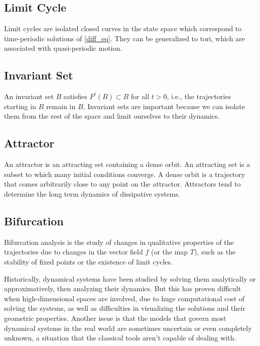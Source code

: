 \documentclass{article}
\begin{document}
\subsection{Limit Cycle}%
\label{sub:limit_cycle}

Limit cycles are isolated closed curves in the state space which correspond to
time-periodic solutions of \eqref{diff_eq}.
They can be generalized to tori, which are associated with quasi-periodic
motion.

\subsection{Invariant Set}%
\label{sub:invariant_set}

An invariant set $B$ satisfies $F^t(B) \subset B$ for all $t > 0$, i.e., the
trajectories starting in $B$ remain in $B$.
Invariant sets are important because we can isolate them from the rest of the
space and limit ourselves to their dynamics.

\subsection{Attractor}%
\label{sub:attractor}

An attractor is an attracting set containing a dense orbit.
An attracting set is a subset to which many initial conditions converge.
A dense orbit is a trajectory that comes arbitrarily close to any point on the
attractor.
Attractors tend to determine the long term dynamics of dissipative systems.

\subsection{Bifurcation}%
\label{sub:bifurcation}

Bifurcation analysis is the study of changes in qualitative properties of the
trajectories due to changes in the vector field $f$ (or the map $T$),
such as the stability of fixed points or the existence of limit cycles.

Historically, dynamical systems have been studied by solving them analytically
or approximatively, then analyzing their dynamics.
But this has proven difficult when high-dimensional spaces are involved,
due to huge computational cost of solving the systems, as well as difficulties
in visualizing the solutions and their geometric properties.
Another issue is that the models that govern most dynamical systems in the real
world are sometimes uncertain or even completely unknown, a situation that the
classical tools aren't capable of dealing with.
\end{document}

